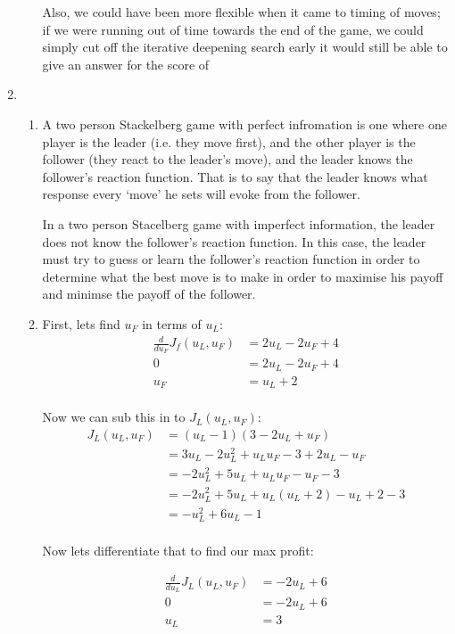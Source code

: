 \documentclass{report}
\begin{document}
\begin{enumerate}
\begin{enumerate}
      Also, we could have been more flexible when it came to timing of
      moves; if we were running out of time towards the end of the
      game, we could simply cut off the iterative deepening search
      early it would still be able to give an answer for the score of

  \end{enumerate}
  \item \begin{enumerate}
    \item A two person Stackelberg game with perfect infromation is
      one where one player is the leader (i.e. they move first), and
      the other player is the follower (they react to the leader's
      move), and the leader knows the follower's reaction
      function. That is to say that the leader knows what response
      every `move' he sets will evoke from the follower.

      In a two person Stacelberg game with imperfect information, the
      leader does not know the follower's reaction function. In this
      case, the leader must try to guess or learn the follower's
      reaction function in order to determine what the best move is to
      make in order to maximise his payoff and minimse the payoff of
      the follower.
    \item First, lets find $u_F$ in terms of $u_L$:
      \[
      \begin{split}
        \frac{d}{du_F}J_f(u_L,u_F) &= 2u_L - 2u_F + 4\\
        0 &= 2u_L - 2u_F + 4\\
        u_F &= u_L + 2\\
      \end{split}
      \]

      Now we can sub this in to $J_L(u_L,u_F)$:
      \[
      \begin{split}
        J_L(u_L,u_F) &= (u_L - 1)(3 - 2u_L + u_F)\\
        &= 3u_L - 2u_L^2 + u_Lu_F - 3 + 2u_L - u_F\\
        &= -2u_L^2 + 5u_L + u_Lu_F - u_F -3\\
        &= -2u_L^2 + 5u_L + u_L(u_L + 2) - u_L + 2 -3\\
        &= -u_L^2 + 6u_L - 1\\
      \end{split}
      \]

      Now lets differentiate that to find our max profit:

      \[
      \begin{split}
        \frac{d}{du_L}J_L(u_L,u_F) &= -2u_L + 6\\
        0 &= -2u_L + 6\\
        u_L &= 3
      \end{split}
      \]


\end{enumerate}
\end{enumerate}
\end{document}
